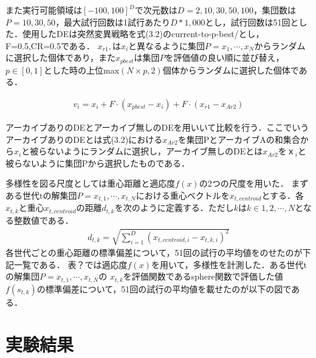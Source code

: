 \documentclass[a4paper,11pt,oneside,openany]{jsbook}
\begin{document}
また実行可能領域は$[-100, 100]^D$で次元数は$D=2,10,30,50,100$，集団数は$P=10,30,50$，最大試行回数は1試行あたり$D*1,000$とし，試行回数は51回とした．使用したDEは突然変異戦略を式(3.2)のcurrent-to-p-best/とし，F=0.5,CR=0.5である．
$x_{r1},$は${x_i}$と異なるように集団$P = {x_1, \cdots, x_N}$からランダムに選択した個体であり，また$x_{pbest}$は集団$P$を評価値の良い順に並び替え，${p\in[0,1]}とした時の上位$max$(N \times p, 2)$個体からランダムに選択した個体である．

\begin{eqnarray}
v_{i} = x_{i} + F\cdot(x_{pbest} - x_{i}) + F\cdot(x_{r1} - x_{Ar2})
\end{eqnarray}

アーカイブありのDEとアーカイブ無しのDEを用いいて比較を行う．ここでいうアーカイブありのDEとは式(3.2)における$x_{Ar2}$を集団PとアーカイブAの和集合から${x_i}$と被らないようにランダムに選択し，アーカイブ無しのDEとは$x_{Ar2}$を$ｘ_{i}$と被らないように集団Pから選択したものである．

多様性を図る尺度としては重心距離と適応度$f(x)$の2つの尺度を用いた．
まずある世代tの解集団$P = {x_{t,1}, \cdots, x_{t,N}}$における重心ベクトルを$x_{t,centroid}$とする．各$x_{t,k}$と重心$x_{t,centroid}$の距離$d_{t,k}$を次のように定義する．ただし$k$は$k\in {1,2,\cdots,N}$となる整数値である．
\begin{eqnarray}
d_{t,k} = \sqrt{\sum_{i=1}^{D} (x_{t,centroid,i} - x_{t,k,i})^2} 
\end{eqnarray}
各世代ごとの重心距離の標準偏差について，51回の試行の平均値をのせたのが下記一覧である．
表？では適応度$f(x)$を用いて，多様性を計測した．ある世代tの解集団$P = {x_{t,1}, \cdots, x_{t,N}}$の $x_{t,k}$を評価関数であるsphere関数で評価した値$f(s_{t,k})$の標準偏差について，51回の試行の平均値を載せたのが以下の図である．

\section{実験結果}
\end{document}
